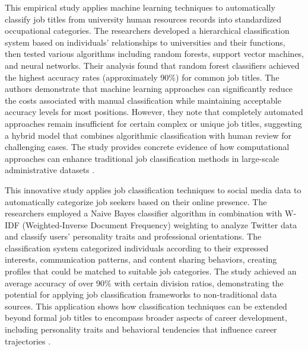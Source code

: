\documentclass[../main.tex]{subfiles}
\begin{document}
This empirical study applies machine learning techniques to automatically classify job titles from university human resources records into standardized occupational categories. The researchers developed a hierarchical classification system based on individuals' relationships to universities and their functions, then tested various algorithms including random forests, support vector machines, and neural networks. Their analysis found that random forest classifiers achieved the highest accuracy rates (approximately 90\%) for common job titles. The authors demonstrate that machine learning approaches can significantly reduce the costs associated with manual classification while maintaining acceptable accuracy levels for most positions. However, they note that completely automated approaches remain insufficient for certain complex or unique job titles, suggesting a hybrid model that combines algorithmic classification with human review for challenging cases. The study provides concrete evidence of how computational approaches can enhance traditional job classification methods in large-scale administrative datasets \cite{ikudo2018}.

This innovative study applies job classification techniques to social media data to automatically categorize job seekers based on their online presence. The researchers employed a Naive Bayes classifier algorithm in combination with W-IDF (Weighted-Inverse Document Frequency) weighting to analyze Twitter data and classify users' personality traits and professional orientations. The classification system categorized individuals according to their expressed interests, communication patterns, and content sharing behaviors, creating profiles that could be matched to suitable job categories. The study achieved an average accuracy of over 90\% with certain division ratios, demonstrating the potential for applying job classification frameworks to non-traditional data sources. This application shows how classification techniques can be extended beyond formal job titles to encompass broader aspects of career development, including personality traits and behavioral tendencies that influence career trajectories \cite{jeesr2021}.
\end{document}
